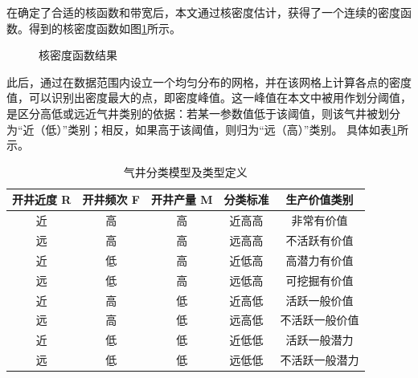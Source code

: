 在确定了合适的核函数和带宽后，本文通过核密度估计，获得了一个连续的密度函数。得到的核密度函数如图\ref{fig:KDE}所示。
\begin{figure}[H]
    \centering
    \hfil
    \hfil
    \caption{核密度函数结果}
    \label{fig:KDE}
\end{figure}
\par
此后，通过在数据范围内设立一个均匀分布的网格，并在该网格上计算各点的密度值，可以识别出密度最大的点，即密度峰值。这一峰值在本文中被用作划分阈值，是区分高低或远近气井类别的依据：若某一参数值低于该阈值，则该气井被划分为“近（低）”类别；相反，如果高于该阈值，则归为“远（高）”类别。
具体如表\ref{table:KDE}所示。
\begin{table}[H]
    \renewcommand{\arraystretch}{1.5}
    \centering
    \caption{气井分类模型及类型定义}
    \begin{tabular}{|c|c|c|c|c|}
    \hline
    开井近度 R & 开井频次 F & 开井产量 M & 分类标准       & 生产价值类别   \\ \hline
    近       & 高       & 高       & 近高高       & 非常有价值 \\ \hline
    远       & 高       & 高       & 远高高       & 不活跃有价值 \\ \hline
    近       & 低       & 高       & 近低高       & 高潜力有价值 \\ \hline
    远       & 低       & 高       & 远低高       & 可挖掘有价值 \\ \hline
    近       & 高       & 低       & 近高低       & 活跃一般价值 \\ \hline
    远       & 高       & 低       & 远高低       & 不活跃一般价值 \\ \hline
    近       & 低       & 低       & 近低低       & 活跃一般潜力 \\ \hline
    远       & 低       & 低       & 远低低       & 不活跃一般潜力 \\ \hline
    \end{tabular}
    \label{table:KDE}
\end{table}
